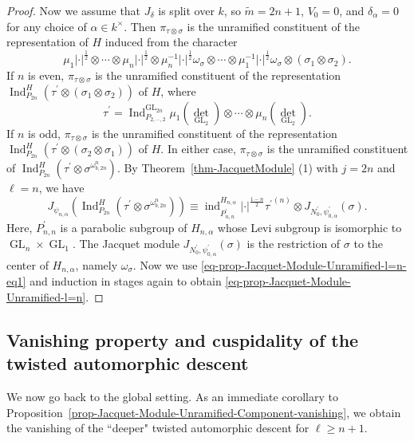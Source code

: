 \documentclass[12pt]{amsart}
\newcommand{\ind}{\operatorname{ind}}
\newcommand{\wt}{\widetilde}
\theoremstyle{remark}
\DeclareMathOperator{\Ind}{Ind}
\DeclareMathOperator{\GL}{GL}
\begin{document}
\begin{proof}
Now we assume that  $J_{\delta}$ is split over $k$, so $\wt m=2n+1$, $V_0=0$, and $\delta_{\alpha}=0$ for any choice of $\alpha\in k^\times$.
Then $\pi_{\tau\otimes \sigma}$ is the unramified constituent of the representation of $H$ induced from the character 
\begin{equation*}
 \mu_1|\cdot|^{\frac{1}{2}}\otimes\cdots \otimes\mu_n|\cdot|^{\frac{1}{2}}\otimes \mu_n^{-1}|\cdot|^{\frac{1}{2}}\omega_{\sigma} \otimes \cdots \otimes   \mu_1^{-1}|\cdot|^{\frac{1}{2}}\omega_{\sigma}\otimes (\sigma_1\otimes\sigma_2).
 \end{equation*}
If $n$ is even,  $\pi_{\tau\otimes \sigma}$ is the unramified constituent of the representation $\Ind_{P_{2n}}^{H}(\tau^\prime \otimes (\sigma_1\otimes\sigma_2))$ of $H$, where
\begin{equation*}
	\tau^\prime= \Ind_{P_{2, \cdots, 2}}^{\GL_{2n}} \mu_1 ({\det}_{\GL_2}) \otimes \cdots \otimes \mu_n ({\det}_{\GL_2})  .
\end{equation*}
If $n$ is odd, $\pi_{\tau\otimes \sigma}$ is the unramified constituent of the representation $\Ind_{P_{2n}}^{H}(\tau^\prime \otimes (\sigma_2\otimes\sigma_1))$ of $H$.
In either case, $\pi_{\tau\otimes \sigma}$ is the unramified constituent of $\Ind_{P_{2n}}^{H}(\tau^\prime \otimes \sigma^{\omega_{b,2n}^n})$.
By Theorem~\ref{thm-JacquetModule} (1) with $j=2n$ and $\ell=n$, we have 
\begin{equation*}
	J_{\psi_{n,\alpha}} (\Ind_{P_{2n}}^{H}(\tau^\prime \otimes \sigma^{\omega_{b,2n}^n})) \equiv \ind_{P^\prime_{n,n}}^{H_{n,\alpha}} |\cdot|^{\frac{1-n}{2}} {\tau^\prime}^{(n)} \otimes J_{N_{0}^\prime, \psi_{0,\alpha} ^\prime}(\sigma). 
\end{equation*}
Here, $P_{n,n}^\prime$ is a parabolic subgroup of $H_{n,\alpha}$ whose Levi subgroup is isomorphic to $\GL_n\times \GL_1$. 
The Jacquet module $J_{N_{0}^\prime, \psi_{0,\alpha} ^\prime}(\sigma)$ is the restriction of $\sigma$ to the center of $H_{n,\alpha}$, namely $\omega_\sigma$. 
Now we use \eqref{eq-prop-Jacquet-Module-Unramified-l=n-eq1} and induction in stages again to obtain \eqref{eq-prop-Jacquet-Module-Unramified-l=n}.
\end{proof}


\subsection{Vanishing property and cuspidality of the twisted automorphic descent}

We now go back to the global setting. As an immediate corollary to Proposition~\ref{prop-Jacquet-Module-Unramified-Component-vanishing}, we obtain the vanishing of the ``deeper" twisted automorphic descent for $\ell\ge n+1$. 
\end{document}
